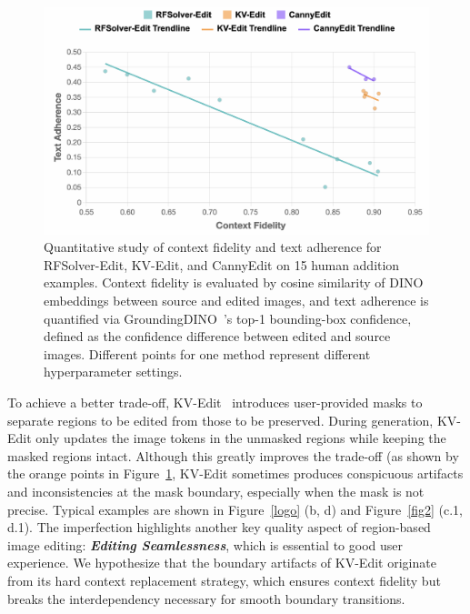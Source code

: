 \documentclass{article}
\begin{document}
\begin{figure}
  \vspace{-12pt} %
    \includegraphics[width=1\linewidth]{figures/tl2.png}
\caption{\small Quantitative study of context fidelity and text adherence for RFSolver-Edit, KV-Edit, and CannyEdit on 15 human addition examples. Context fidelity is evaluated by cosine similarity of DINO \citep{caron2021emerging} embeddings between source and edited images, and text adherence is quantified via GroundingDINO~\citep{liu2024grounding}'s top-1 bounding-box confidence, defined as the confidence difference between edited and source images.  Different points for one method represent different hyperparameter settings.}
    \label{treadline}
      \vspace{-5pt} %
\end{figure}

To achieve a better trade-off, KV-Edit~\citep{zhu2025kv} introduces user-provided masks to separate regions to be edited from those to be preserved.
During generation, KV-Edit only updates the image tokens in the unmasked regions while keeping the masked regions intact.
Although this greatly improves the trade-off (as shown by the orange points in Figure~\ref{treadline}, KV-Edit sometimes produces conspicuous artifacts and inconsistencies at the mask boundary, especially when the mask is not precise.
Typical examples are shown in Figure~\ref{logo} (b, d) and Figure~\ref{fig2} (c.1, d.1).
The imperfection highlights another key quality aspect of region-based image editing: \textbf{\textit{Editing Seamlessness}}, which is essential to good user experience.
{We hypothesize that the boundary artifacts of KV-Edit originate from its hard context replacement strategy, which ensures context fidelity but breaks the interdependency necessary for smooth boundary transitions.}
\end{document}
